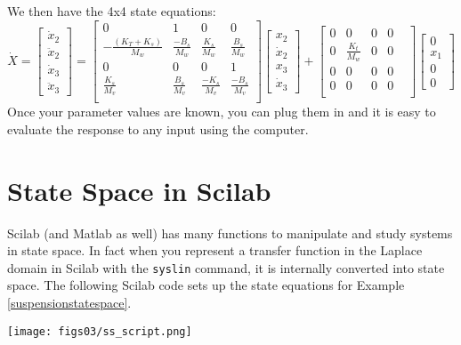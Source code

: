 \documentclass[letterpaper]{book}
\begin{document}
\begin{Example}
We then have the 4x4 state equations:
\[
\dot{X} = \begin{bmatrix}\dot{x}_2 \\ \ddot{x}_2 \\ \dot{x}_3 \\ \ddot{x}_3\end{bmatrix}
=
\begin{bmatrix} 0&1&0&0\\
-\frac{(K_T+K_s)}{M_w}&\frac{-B_s}{M_w}&\frac{K_s}{M_w}&\frac{B_s}{M_w}\\
0&0&0&1 \\
\frac{K_s}{M_v}&\frac{B_s}{M_v}&\frac{-K_s}{M_v}&\frac{-B_s}{M_v}\\
\end{bmatrix}
\begin{bmatrix}x_2\\\dot{x}_2\\x_3\\\dot{x}_3 \end{bmatrix}+
\begin{bmatrix}
    0&0&0&0&\\
    0&\frac{K_t}{M_w}&0&0&\\
    0&0&0&0&\\
    0&0&0&0&\\
\end{bmatrix}
\begin{bmatrix} 0 \\x_1\\0\\ 0\end{bmatrix}
\]
Once your parameter values are known, you can plug them in and it is easy to evaluate the response to any input using the computer.
\end{Example}

\section{State Space in Scilab}
Scilab (and Matlab as well) has many functions to manipulate and study systems in state space.  In fact when you represent a transfer function in the Laplace domain in Scilab with the {\tt syslin} command, it is internally converted into state space.   
The following Scilab code sets up the state equations for Example \ref{suspensionstatespace}.

\begin{center}
\texttt{[image: figs03/ss\_script.png]}
\end{center}
\end{document}
